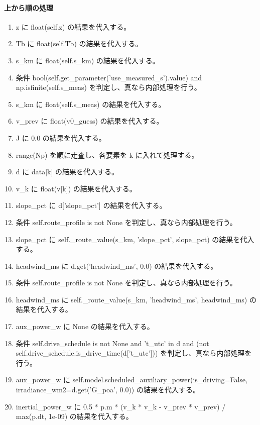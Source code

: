 \documentclass[a4paper,11pt]{article}
\begin{document}
            \paragraph{上から順の処理}
            \begin{enumerate}[leftmargin=1.8em]
            \item z に float(self.z) の結果を代入する。
\item Tb に float(self.Tb) の結果を代入する。
\item s\_km に float(self.s\_km) の結果を代入する。
\item 条件 bool(self.get\_parameter('use\_measured\_s').value) and np.isfinite(self.s\_meas) を判定し、真なら内部処理を行う。
\item   s\_km に float(self.s\_meas) の結果を代入する。
\item v\_prev に float(v0\_guess) の結果を代入する。
\item J に 0.0 の結果を代入する。
\item range(Np) を順に走査し、各要素を k に入れて処理する。
\item   d に data[k] の結果を代入する。
\item   v\_k に float(v[k]) の結果を代入する。
\item   slope\_pct に d['slope\_pct'] の結果を代入する。
\item   条件 self.route\_profile is not None を判定し、真なら内部処理を行う。
\item     slope\_pct に self.\_route\_value(s\_km, 'slope\_pct', slope\_pct) の結果を代入する。
\item   headwind\_ms に d.get('headwind\_ms', 0.0) の結果を代入する。
\item   条件 self.route\_profile is not None を判定し、真なら内部処理を行う。
\item     headwind\_ms に self.\_route\_value(s\_km, 'headwind\_ms', headwind\_ms) の結果を代入する。
\item   aux\_power\_w に None の結果を代入する。
\item   条件 self.drive\_schedule is not None and 't\_utc' in d and (not self.drive\_schedule.is\_drive\_time(d['t\_utc'])) を判定し、真なら内部処理を行う。
\item     aux\_power\_w に self.model.scheduled\_auxiliary\_power(is\_driving=False, irradiance\_wm2=d.get('G\_poa', 0.0)) の結果を代入する。
\item   inertial\_power\_w に 0.5 * p.m * (v\_k * v\_k - v\_prev * v\_prev) / max(p.dt, 1e-09) の結果を代入する。

\end{enumerate}
\end{document}
